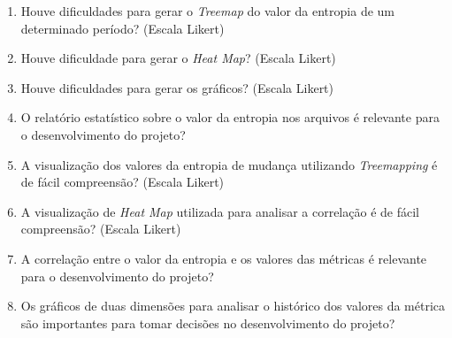 \begin{enumerate}
  \item Houve dificuldades para gerar o \textit{Treemap} do valor da entropia de um determinado período? (Escala Likert)
  
  \item Houve dificuldade para gerar o \textit{Heat Map}? (Escala Likert)
  
  \item Houve dificuldades para gerar os gráficos? (Escala Likert)
  
  \item O relatório estatístico sobre o valor da entropia nos arquivos é relevante para o desenvolvimento do projeto?
  
  \item A visualização dos valores da entropia de mudança utilizando \textit{Treemapping} é de fácil compreensão? (Escala Likert)
  
  \item A visualização de \textit{Heat Map} utilizada para analisar a correlação é de fácil compreensão? (Escala Likert)
  
  \item A correlação entre o valor da entropia e os valores das métricas é relevante para o desenvolvimento do projeto?
  
  \item Os gráficos de duas dimensões para analisar o histórico dos valores da métrica são importantes para tomar decisões no desenvolvimento do projeto?
\end{enumerate}